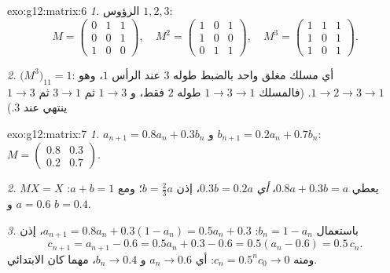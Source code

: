 \begin{solution}{exo:g12:matrix:6}
\emph{1.}  الرؤوس $1, 2, 3$:
\[
M = \begin{pmatrix} 0&1&1\\ 0&0&1\\ 1&0&0\end{pmatrix}, \quad
M^2 = \begin{pmatrix} 1&0&1\\ 1&0&0\\ 0&1&1\end{pmatrix}, \quad
M^3 = \begin{pmatrix} 1&1&1\\ 1&0&1\\ 1&0&1 \end{pmatrix}.
\]

\emph{2.} $\bigl(M^3\bigr)_{11} = 1$: أي مسلك مغلق واحد بالضبط طوله $3$
عند الرأس $1$، وهو $1 \to 2 \to 3 \to 1$. (فالمسلك
$1 \to 3 \to 1$ طوله $2$ فقط، و $1 \to 3$ ثم $3\to1$ ثم
$1\to3$ ينتهي عند $3$.)
\end{solution}

\begin{solution}{exo:g12:matrix:7}
\emph{1.} $a_{n+1} = 0.8a_n + 0.3b_n$ و $b_{n+1} = 0.2a_n + 0.7b_n$:
$M = \begin{pmatrix} 0.8 & 0.3\\ 0.2 & 0.7\end{pmatrix}$.

\emph{2.} $MX = X$ يعطي $0.8a + 0.3b = a$، \emph{أي} $0.3b = 0.2a$، إذن
$b = \frac23 a$؛ ومع $a + b = 1$: $a = 0.6$ و $b = 0.4$.

\emph{3.} باستعمال $b_n = 1 - a_n$:
$a_{n+1} = 0.8a_n + 0.3(1 - a_n) = 0.5a_n + 0.3$، إذن
\[
c_{n+1} = a_{n+1} - 0.6 = 0.5a_n + 0.3 - 0.6 = 0.5(a_n - 0.6) = 0.5\,c_n .
\]
ومنه $c_n = 0.5^n c_0 \to 0$: أي $a_n \to 0.6$ و $b_n \to 0.4$، مهما كان
 الابتدائي.
\end{solution}

